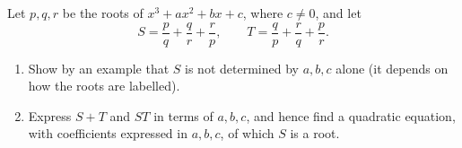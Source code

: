 Let $p,q,r$ be the roots of $x^3+ax^2+bx+c$, where $c\ne0$, and let
\[S=\dfrac pq+\dfrac qr+\dfrac rp,\qquad T=\dfrac qp+\dfrac rq+\dfrac pr.\]
\begin{enumerate}
\item[(a)] Show by an example that $S$ is not determined by $a,b,c$ alone (it depends on how the roots are labelled).
\item[(b)] Express $S+T$ and $ST$ in terms of $a,b,c$, and hence find a quadratic equation, with coefficients expressed in $a,b,c$, of which $S$ is a root.
\end{enumerate}

